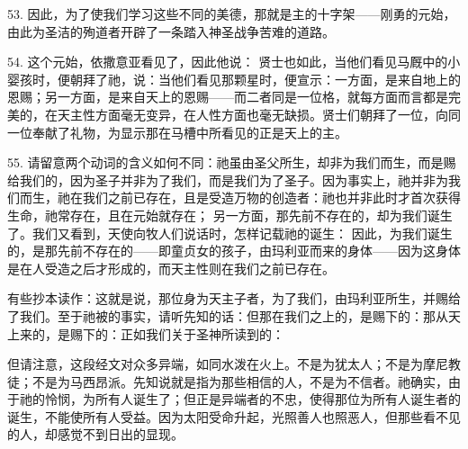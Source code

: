53. 因此，为了使我们学习这些不同的美德，那就是主的十字架——刚勇的元始，由此为圣洁的殉道者开辟了一条踏入神圣战争苦难的道路。\par

\par

54. 这个元始，依撒意亚看见了，因此他说： 贤士也如此，当他们看见马厩中的小婴孩时，便朝拜了祂，说：当他们看见那颗星时，便宣示：一方面，是来自地上的恩赐；另一方面，是来自天上的恩赐——而二者同是一位格，就每方面而言都是完美的，在天主性方面毫无变异，在人性方面也毫无缺损。贤士们朝拜了一位，向同一位奉献了礼物，为显示那在马槽中所看见的正是天上的主。\par

55. 请留意两个动词的含义如何不同：祂虽由圣父所生，却非为我们而生，而是赐给我们的，因为圣子并非为了我们，而是我们为了圣子。因为事实上，祂并非为我们而生，祂在我们之前已存在，且是受造万物的创造者：祂也并非此时才首次获得生命，祂常存在，且在元始就存在； 另一方面，那先前不存在的，却为我们诞生了。我们又看到，天使向牧人们说话时，怎样记载祂的诞生： 因此，为我们诞生的，是那先前不存在的——即童贞女的孩子，由玛利亚而来的身体——因为这身体是在人受造之后才形成的，而天主性则在我们之前已存在。\par

有些抄本读作：这就是说，那位身为天主子者，为了我们，由玛利亚所生，并赐给了我们。至于祂被的事实，请听先知的话：但那在我们之上的，是赐下的：那从天上来的，是赐下的：正如我们关于圣神所读到的：\par

但请注意，这段经文对众多异端，如同水泼在火上。不是为犹太人；不是为摩尼教徒；不是为马西昂派。先知说就是指为那些相信的人，不是为不信者。祂确实，由于祂的怜悯，为所有人诞生了；但正是异端者的不忠，使得那位为所有人诞生者的诞生，不能使所有人受益。因为太阳受命升起，光照善人也照恶人，但那些看不见的人，却感觉不到日出的显现。\par

